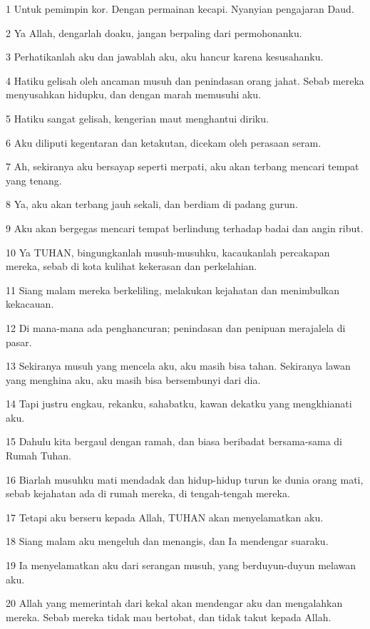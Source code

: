 \par 1 Untuk pemimpin kor. Dengan permainan kecapi. Nyanyian pengajaran Daud.
\par 2 Ya Allah, dengarlah doaku, jangan berpaling dari permohonanku.
\par 3 Perhatikanlah aku dan jawablah aku, aku hancur karena kesusahanku.
\par 4 Hatiku gelisah oleh ancaman musuh dan penindasan orang jahat. Sebab mereka menyusahkan hidupku, dan dengan marah memusuhi aku.
\par 5 Hatiku sangat gelisah, kengerian maut menghantui diriku.
\par 6 Aku diliputi kegentaran dan ketakutan, dicekam oleh perasaan seram.
\par 7 Ah, sekiranya aku bersayap seperti merpati, aku akan terbang mencari tempat yang tenang.
\par 8 Ya, aku akan terbang jauh sekali, dan berdiam di padang gurun.
\par 9 Aku akan bergegas mencari tempat berlindung terhadap badai dan angin ribut.
\par 10 Ya TUHAN, bingungkanlah musuh-musuhku, kacaukanlah percakapan mereka, sebab di kota kulihat kekerasan dan perkelahian.
\par 11 Siang malam mereka berkeliling, melakukan kejahatan dan menimbulkan kekacauan.
\par 12 Di mana-mana ada penghancuran; penindasan dan penipuan merajalela di pasar.
\par 13 Sekiranya musuh yang mencela aku, aku masih bisa tahan. Sekiranya lawan yang menghina aku, aku masih bisa bersembunyi dari dia.
\par 14 Tapi justru engkau, rekanku, sahabatku, kawan dekatku yang mengkhianati aku.
\par 15 Dahulu kita bergaul dengan ramah, dan biasa beribadat bersama-sama di Rumah Tuhan.
\par 16 Biarlah musuhku mati mendadak dan hidup-hidup turun ke dunia orang mati, sebab kejahatan ada di rumah mereka, di tengah-tengah mereka.
\par 17 Tetapi aku berseru kepada Allah, TUHAN akan menyelamatkan aku.
\par 18 Siang malam aku mengeluh dan menangis, dan Ia mendengar suaraku.
\par 19 Ia menyelamatkan aku dari serangan musuh, yang berduyun-duyun melawan aku.
\par 20 Allah yang memerintah dari kekal akan mendengar aku dan mengalahkan mereka. Sebab mereka tidak mau bertobat, dan tidak takut kepada Allah.
